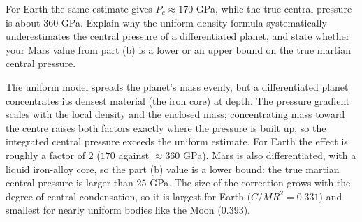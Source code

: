 \parti For Earth the same estimate gives $P_c \approx 170$ GPa, while the true central pressure is about $360$ GPa.
Explain why the uniform-density formula systematically underestimates the central pressure of a differentiated planet,
and state whether your Mars value from part (b) is a lower or an upper bound on the true martian central pressure.

\begin{solution}
The uniform model spreads the planet's mass evenly, but a differentiated planet concentrates
its densest material (the iron core) at depth.
The pressure gradient scales with the local density and the enclosed mass;
concentrating mass toward the centre raises both factors exactly where the pressure is built up,
so the integrated central pressure exceeds the uniform estimate.
For Earth the effect is roughly a factor of 2 ($170$ against $\approx 360$ GPa).
Mars is also differentiated, with a liquid iron-alloy core, so the part (b) value is a lower bound:
the true martian central pressure is larger than $25$ GPa.
The size of the correction grows with the degree of central condensation,
so it is largest for Earth ($C/MR^2 = 0.331$) and smallest for nearly uniform bodies like the Moon ($0.393$).
\end{solution}
